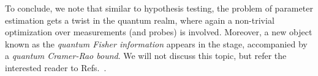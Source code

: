 
To conclude, we note that similar to hypothesis testing, the problem of parameter estimation gets a twist in the quantum realm, where again a non-trivial optimization over measurements (and probes) is involved. Moreover, a new object known as the \textit{quantum Fisher information} appears in the stage, accompanied by a \textit{quantum Cramer-Rao bound}. We will not discuss this topic, but refer the interested reader to Refs.~\cite{Meyer2021fisherinformationin,helstromBOOK,giovanetti2006quatnum}.
